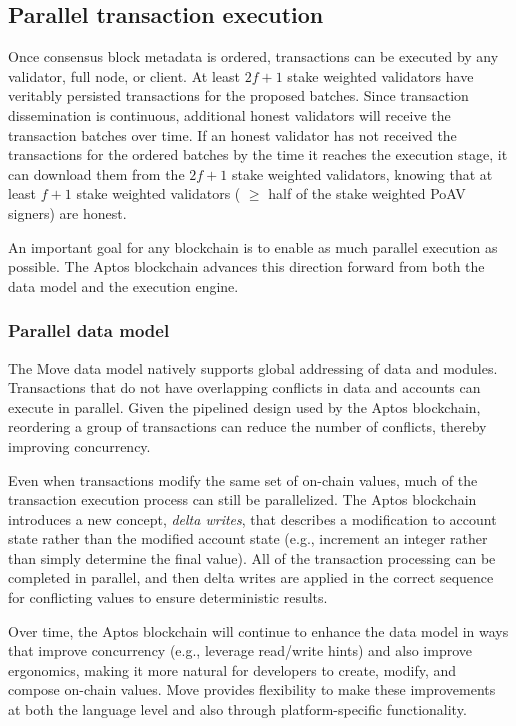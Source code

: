 \documentclass{article}
\begin{document}
\subsection{Parallel transaction execution}
\label{subsec:parallel_transaction_execution}

Once consensus block metadata is ordered, transactions can be executed by any validator, full node, or client. At least $2f+1$ stake weighted validators have veritably persisted transactions for the proposed batches. Since transaction dissemination is continuous, additional honest validators will receive the transaction batches over time. If an honest validator has not received the transactions for the ordered batches by the time it reaches the execution stage, it can download them from the $2f+1$ stake weighted validators, knowing that at least $f+1$ stake weighted validators ( $\ge$ half of the stake weighted PoAV signers) are honest.   

An important goal for any blockchain is to enable as much parallel execution as possible.  The Aptos blockchain advances this direction forward from both the data model and the execution engine.

\subsubsection{Parallel data model}

The Move data model natively supports global addressing of data and modules.  Transactions that do not have overlapping conflicts in data and accounts can execute in parallel.  Given the pipelined design used by the Aptos blockchain, reordering a group of transactions can reduce the number of conflicts, thereby improving concurrency.

Even when transactions modify the same set of on-chain values, much of the transaction execution process can still be parallelized. The Aptos blockchain introduces a new concept, \emph{delta writes}, that describes a modification to account state rather than the modified account state (e.g., increment an integer rather than simply determine the final value). All of the transaction processing can be completed in parallel, and then delta writes are applied in the correct sequence for conflicting values to ensure deterministic results.

Over time, the Aptos blockchain will continue to enhance the data model in ways that improve concurrency (e.g., leverage read/write hints) and also improve ergonomics, making it more natural for developers to create, modify, and compose on-chain values. Move provides flexibility to make these improvements at both the language level and also through platform-specific functionality.
\end{document}
